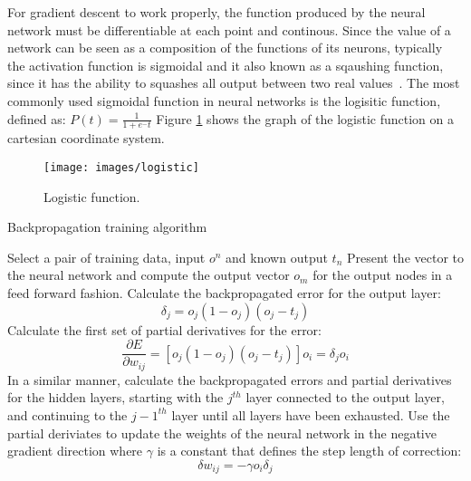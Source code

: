 
For gradient descent to work properly, the function produced by the neural network must be
differentiable at each point and continous. 
Since the value of a network can be seen as a composition of the
functions of its neurons, typically the activation function is sigmoidal and it also known as a sqaushing function, since it has the ability to squashes all output between two real values~\cite{mitchell1997}.
The most commonly used sigmoidal function in neural networks is the logisitic function, defined as:
$P(t) = \frac{1}{1 + e^-t}$
Figure \ref{logistic} shows the graph of the logistic function on a cartesian coordinate system.

\begin{figure}[h!]
  \centering
  \texttt{[image: images/logistic]}
  \caption{Logistic function.}
  \label{logistic}
\end{figure}

\begin{algorithm}[h!]
\caption{Backpropagation training algorithm}
\label{backpropAlg}    
\begin{algorithmic}

\STATE Select a pair of training data, input $o^n$ and known output $t_n$
\STATE Present the vector to the neural network and compute the
output vector $o_m$ for the output nodes in a feed forward fashion.
\STATE Calculate the backpropagated error for the output layer: 
\begin{displaymath}
\delta_j = o_j(1 - o_j)(o_j -t_j) 
\end{displaymath} 
\STATE Calculate the first set of partial derivatives for the error:
\begin{displaymath}
\frac{\partial E}{\partial w_{ij}} = [o_j(1 - o_j)(o_j - t_j)]o_i =
\delta_j o_i
\end{displaymath} 
\STATE In a similar manner, calculate the backpropagated errors and
partial derivatives for the
hidden layers, starting with the $j^{th}$ layer connected to the
output layer, and continuing to the $j-1^{th}$ layer until all layers
have been exhausted.
\STATE Use the partial deriviates to update the weights of the
neural network in the negative gradient direction where $\gamma$ is a
constant that defines the step length of correction:
\begin{displaymath}
\delta w_{ij} = - \gamma o_i \delta_j
\end{displaymath}
\ENDWHILE
\end{algorithmic}
\end{algorithm}

